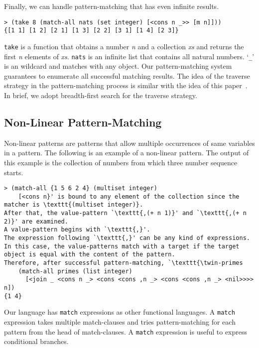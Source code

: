 \documentclass{article}
\begin{document}
Finally, we can handle pattern-matching that has even infinite results.

{\footnotesize
\begin{verbatim}
> (take 8 (match-all nats (set integer) [<cons n _>> [m n]]))
{[1 1] [1 2] [2 1] [1 3] [2 2] [3 1] [1 4] [2 3]}
\end{verbatim}
}

\texttt{take} is a function that obtains a number \textit{n} and a collection \textit{xs} and returns the first \textit{n} elements of \textit{xs}.
\texttt{nats} is an infinite list that contains all natural numbers.
`\texttt{_}' is an wildcard and matches with any object.
Our pattern-matching system guarantees to enumerate all successful matching results.
The idea of the traverse strategy in the pattern-matching process is similar with the idea of this paper~\cite{spivey2000functional}.
In brief, we adopt breadth-first search for the traverse strategy.

\subsection{Non-Linear Pattern-Matching}

Non-linear patterns are patterns that allow multiple occurrences of same variables in a pattern.
The following is an example of a non-linear pattern.
The output of this example is the collection of numbers from which three number sequence starts.

{\footnotesize
\begin{verbatim}
> (match-all {1 5 6 2 4} (multiset integer)
    [<cons n}' is bound to any element of the collection since the matcher is \texttt{(multiset integer)}.
After that, the value-pattern `\texttt{,(+ n 1)}' and `\texttt{,(+ n 2)}' are examined.
A value-pattern begins with `\texttt{,}'.
The expression following `\texttt{,}' can be any kind of expressions.
In this case, the value-patterns match with a target if the target object is equal with the content of the pattern.
Therefore, after successful pattern-matching, `\texttt{\twin-primes
    (match-all primes (list integer)
      [<join _ <cons n _> <cons <cons ,n _> <cons <cons ,n _> <nil>>>> n])
{1 4}
\end{verbatim}
}

Our language has \texttt{match} expressions as other functional languages.
A \texttt{match} expression takes multiple match-clauses and tries pattern-matching for each pattern from the head of match-clauses.
A \texttt{match} expression is useful to express conditional branches.
\end{document}
